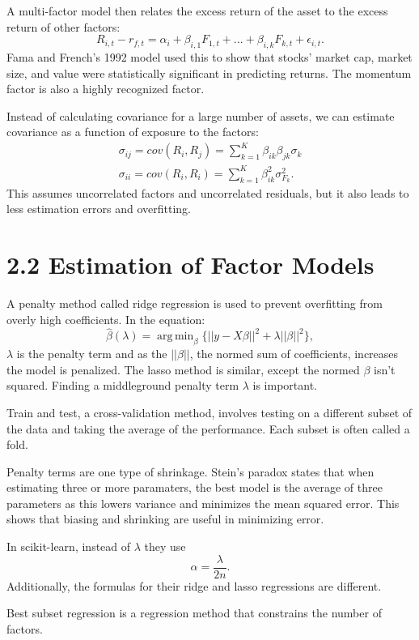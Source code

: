 \documentclass{article}
\DeclareMathOperator*{\argmin}{arg\,min}
\begin{document}
A multi-factor model then relates the excess return of the 
asset to the excess return of other factors:
\[
R_{i,t}-r_{f,t} = \alpha_i + \beta_{i,1}F_{1,t} + ... + \beta_{i,k}F_{k,t} + \epsilon_{i,t}.
\] 
Fama and French's 1992 model used this to show that stocks'
market cap, market size, and value were statistically significant 
in predicting returns. The momentum factor is also a highly
recognized factor. 

Instead of calculating covariance for a large number of assets,
we can estimate covariance as a function of exposure to the factors:
\begin{gather}
    \sigma_{ij} = cov(R_i, R_j) = \sum_{k=1}^K \beta_{ik} \beta_{jk} \sigma_k \nonumber \\  
    \sigma_{ii} = cov(R_i, R_i) = \sum_{k=1}^K \beta_{ik}^2 \sigma_{F_k}^2 \nonumber.
\end{gather}
This assumes uncorrelated factors and uncorrelated residuals, but 
it also leads to less estimation errors and overfitting.

\section*{2.2 Estimation of Factor Models}

A penalty method called ridge regression is used to prevent 
overfitting from overly high coefficients. In the equation:
\[
\hat{\beta}(\lambda) = \argmin_\beta \{|| y - X\beta ||^2 + \lambda ||\beta||^2\},
\]
$\lambda$ is the penalty term and as the $||\beta||$, the normed sum of coefficients,
increases the model is penalized. The lasso method is similar, 
except the normed $\beta$ isn't squared. Finding a middleground
penalty term $\lambda$ is important.

Train and test, a cross-validation method, involves testing on
a different subset of the data and taking the average of the performance.
Each subset is often called a fold. 

Penalty terms are one type of shrinkage. Stein's paradox states
that when estimating three or more paramaters, the best model
is the average of three parameters as this lowers variance
and minimizes the mean squared error. This shows that biasing
and shrinking are useful in minimizing error.

In scikit-learn, instead of $\lambda$ they use
\[
\alpha = \frac{\lambda}{2n}. 
\]
Additionally, the formulas for their ridge and lasso regressions
are different. 

Best subset regression is a regression method that constrains
the number of factors.
\end{document}

